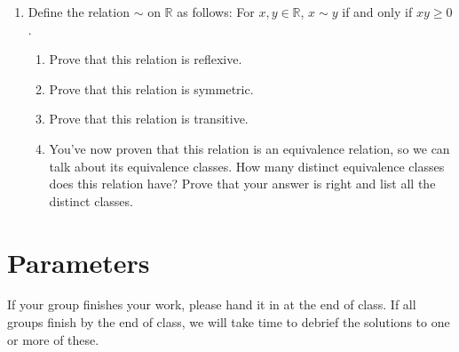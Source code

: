 \documentclass[11pt]{article}
\begin{document}
\begin{enumerate}
	\item Define the relation $\sim$ on $\mathbb{R}$ as follows: For $x,y \in \mathbb{R}$, $x \sim y$ if and only if $xy \geq 0$. 
	\begin{enumerate}
		\item Prove that this relation is reflexive. 
		\item Prove that this relation is symmetric. 
		\item Prove that this relation is transitive. 
		\item You've now proven that this relation is an equivalence relation, so we can talk about its equivalence classes. How many distinct equivalence classes does this relation have? Prove that your answer is right and list all the distinct classes. 
	\end{enumerate}
	
\end{enumerate}



\section*{Parameters}

If your group finishes your work, please hand it in at the end of class. If all groups finish by the end of class, we will take time to debrief the solutions to one or more of these. 
\end{document}
